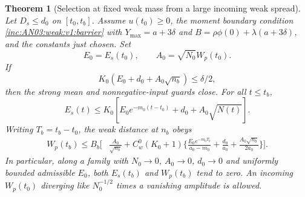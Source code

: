\documentclass[11pt]{article}
\numberwithin{equation}{section}
\newtheorem{theorem}{Theorem}[section]\newtheorem{lemma}[theorem]{Lemma}\newtheorem{proposition}[theorem]{Proposition}\newtheorem{corollary}[theorem]{Corollary}
\theoremstyle{remark}\newtheorem{remark}[theorem]{Remark}
\begin{document}
\begin{theorem}[Selection at fixed weak mass from a large incoming weak spread]\label{inc:AN03:weak:v1:selection}
Let $D_s\le d_0$ on $[t_0,t_b]$. Assume $u(t_0)\ge0$, the moment boundary condition \eqref{inc:AN03:weak:v1:barrier} with $Y_{\max}=a+3\delta$ and $B=\rho\phi(0)+\lambda(a+3\delta)$, and the constants just chosen. Set
\[
 E_0=E_s(t_0),\qquad A_0=\sqrt{N_0}W_p(t_0).
\]
If
\begin{equation}\label{inc:AN03:weak:v1:guard}
 K_0(E_0+d_0+A_0\sqrt{n_b})\le\delta/2,
\end{equation}
then the strong mean and nonnegative-input guards close. For all $t\le t_b$,
\begin{equation}\label{inc:AN03:weak:v1:Eresult}
 E_s(t)\le K_0[E_0e^{-m_0(t-t_0)}+d_0+A_0\sqrt{N(t)}].
\end{equation}
Writing $T_b=t_b-t_0$, the weak distance at $n_b$ obeys
\begin{align}
 W_p(t_b)\le B_b\Bigg[&\frac{A_0}{\sqrt{n_b}}+C_w^0(K_0+1)
 \bigg\{\frac{E_0e^{-m_0T_b}}{a_0-m_0}
 +\frac{d_0}{a_0}+\frac{A_0\sqrt{n_b}}{2a_0}\bigg\}\Bigg].
 \label{inc:AN03:weak:v1:Wresult}
\end{align}
In particular, along a family with $N_0\to0$, $A_0\to0$, $d_0\to0$ and uniformly bounded admissible $E_0$, both $E_s(t_b)$ and $W_p(t_b)$ tend to zero. An incoming $W_p(t_0)$ diverging like $N_0^{-1/2}$ times a vanishing amplitude is allowed.
\end{theorem}
\end{document}
